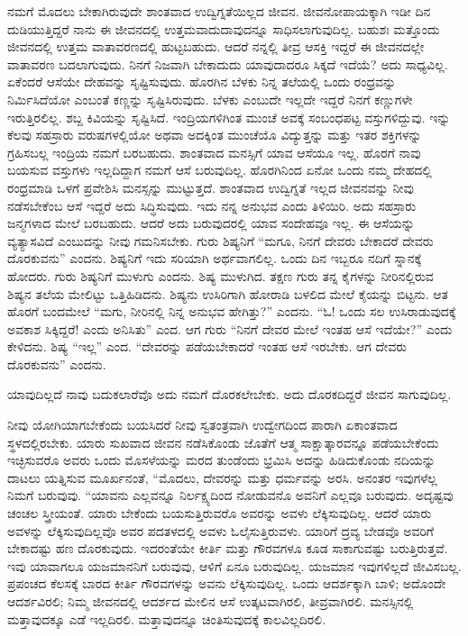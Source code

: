 ನಮಗೆ ಮೊದಲು ಬೇಕಾಗಿರುವುದೇ ಶಾಂತವಾದ ಉದ್ವಿಗ್ನತೆಯಿಲ್ಲದ ಜೀವನ. ಜೀವನೋಪಾಯಕ್ಕಾಗಿ ಇಡೀ ದಿನ ದುಡಿಯುತ್ತಿದ್ದರೆ ನಾನು ಈ ಜೀವನದಲ್ಲಿ ಉತ್ತಮವಾದುದಾವುದನ್ನೂ ಸಾಧಿಸಲಾಗುವುದಿಲ್ಲ. ಬಹುಶಃ ಮತ್ತೊಂದು ಜೀವನದಲ್ಲಿ ಉತ್ತಮ ವಾತಾವರಣದಲ್ಲಿ ಹುಟ್ಟಬಹುದು. ಆದರೆ ನನ್ನಲ್ಲಿ ತೀವ್ರ ಆಸಕ್ತಿ ಇದ್ದರೆ ಈ ಜೀವನದಲ್ಲೇ ವಾತಾವರಣ ಬದಲಾಗುವುದು. ನಿನಗೆ ನಿಜವಾಗಿ ಬೇಕಾದುದು ಯಾವುದಾದರೂ ಸಿಕ್ಕದೆ ಇದೆಯೆ? ಅದು ಸಾಧ್ಯವಿಲ್ಲ. ಏಕೆಂದರೆ ಆಸೆಯೇ ದೇಹವನ್ನು ಸೃಷ್ಟಿಸುವುದು. ಹೊರಗಿನ ಬೆಳಕು ನಿನ್ನ ತಲೆಯಲ್ಲಿ ಒಂದು ರಂಧ್ರವನ್ನು ನಿರ್ಮಿಸಿದೆಯೋ ಎಂಬಂತೆ ಕಣ್ಣನ್ನು ಸೃಷ್ಟಿಸಿರುವುದು. ಬೆಳಕು ಎಂಬುದೇ ಇಲ್ಲದೇ ಇದ್ದರೆ ನಿನಗೆ ಕಣ್ಣುಗಳೇ ಇರುತ್ತಿರಲಿಲ್ಲ. ಶಬ್ದ ಕಿವಿಯನ್ನು ಸೃಷ್ಟಿಸಿದೆ. ಇಂದ್ರಿಯಗಳಿಗಿಂತ ಮುಂಚೆ ಅವಕ್ಕೆ ಸಂಬಂಧಪಟ್ಟ ವಸ್ತುಗಳಿದ್ದುವು. ಇನ್ನು ಕೆಲವು ಸಹಸ್ರಾರು ವರುಷಗಳಲ್ಲಿಯೋ ಅಥವಾ ಅದಕ್ಕಿಂತ ಮುಂಚೆಯೊ ವಿದ್ಯುತ್ತನ್ನು ಮತ್ತು ಇತರ ಶಕ್ತಿಗಳನ್ನು ಗ್ರಹಿಸಬಲ್ಲ ಇಂದ್ರಿಯ ನಮಗೆ ಬರಬಹುದು. ಶಾಂತವಾದ ಮನಸ್ಸಿಗೆ ಯಾವ ಆಸೆಯೂ ಇಲ್ಲ. ಹೊರಗೆ ನಾವು ಬಯಸುವ ವಸ್ತುಗಳು ಇಲ್ಲದಿದ್ದಾಗ ನಮಗೆ ಆಸೆ ಬರುವುದಿಲ್ಲ. ಹೊರಗಿನಿಂದ ಏನೋ ಒಂದು ನಮ್ಮ ದೇಹದಲ್ಲಿ ರಂಧ್ರಮಾಡಿ ಒಳಗೆ ಪ್ರವೇಶಿಸಿ ಮನಸ್ಸನ್ನು ಮುಟ್ಟುತ್ತದೆ. ಶಾಂತವಾದ ಉದ್ವಿಗ್ನತೆ ಇಲ್ಲದ ಜೀವನವನ್ನು ನೀವು ನಡೆಸಬೇಕೆಂಬ ಆಸೆ ಇದ್ದರೆ ಅದು ಸಿದ್ಧಿಸುವುದು. ಇದು ನನ್ನ ಅನುಭವ ಎಂದು ತಿಳಿಯಿರಿ. ಅದು ಸಹಸ್ರಾರು ಜನ್ಮಗಳಾದ ಮೇಲೆ ಬರಬಹುದು. ಆದರೆ ಅದು ಬರುವುದರಲ್ಲಿ ಯಾವ ಸಂದೇಹವೂ ಇಲ್ಲ. ಈ ಆಸೆಯನ್ನು ವ್ಯತ್ಯಾಸವಿದೆ ಎಂಬುದನ್ನು ನೀವು ಗಮನಿಸಬೇಕು. ಗುರು ಶಿಷ್ಯನಿಗೆ “ಮಗೂ, ನಿನಗೆ ದೇವರು ಬೇಕಾದರೆ ದೇವರು ದೊರಕುವನು” ಎಂದನು. ಶಿಷ್ಯನಿಗೆ ಇದು ಸರಿಯಾಗಿ ಅರ್ಥವಾಗಲಿಲ್ಲ. ಒಂದು ದಿನ ಇಬ್ಬರೂ ನದಿಗೆ ಸ್ನಾನಕ್ಕೆ ಹೋದರು. ಗುರು ಶಿಷ್ಯನಿಗೆ ಮುಳುಗು ಎಂದನು. ಶಿಷ್ಯ ಮುಳುಗಿದ. ತಕ್ಷಣ ಗುರು ತನ್ನ ಕೈಗಳನ್ನು ನೀರಿನಲ್ಲಿರುವ ಶಿಷ್ಯನ ತಲೆಯ ಮೇಲಿಟ್ಟು ಒತ್ತಿಹಿಡಿದನು. ಶಿಷ್ಯನು ಉಸಿರಿಗಾಗಿ ಹೋರಾಡಿ ಬಳಲಿದ ಮೇಲೆ ಕೈಯನ್ನು ಬಿಟ್ಟನು. ಆತ ಹೊರಗೆ ಬಂದಮೇಲೆ “ಮಗು, ನೀರಿನಲ್ಲಿ ನಿನ್ನ ಅನುಭವ ಹೇಗಿತ್ತು?” ಎಂದನು. “ಓ! ಒಂದು ಸಲ ಉಸಿರಾಡುವುದಕ್ಕೆ ಅವಕಾಶ ಸಿಕ್ಕಿದ್ದರೆ! ಎಂದು ಅನಿಸಿತು” ಎಂದ. ಆಗ ಗುರು “ನಿನಗೆ ದೇವರ ಮೇಲೆ ಇಂತಹ ಆಸೆ ಇದೆಯೇ?” ಎಂದು ಕೇಳಿದನು. ಶಿಷ್ಯ “ಇಲ್ಲ” ಎಂದ. “ದೇವರನ್ನು ಪಡೆಯಬೇಕಾದರೆ ಇಂತಹ ಆಸೆ ಇರಬೇಕು. ಆಗ ದೇವರು ದೊರಕುವನು” ಎಂದನು.

ಯಾವುದಿಲ್ಲದೆ ನಾವು ಬದುಕಲಾರೆವೊ ಅದು ನಮಗೆ ದೊರಕಲೇಬೇಕು. ಅದು ದೊರಕದಿದ್ದರೆ ಜೀವನ ಸಾಗುವುದಿಲ್ಲ.

ನೀವು ಯೋಗಿಯಾಗಬೇಕೆಂದು ಬಯಸಿದರೆ ನೀವು ಸ್ವತಂತ್ರವಾಗಿ ಉದ್ವೇಗದಿಂದ ಪಾರಾಗಿ ಏಕಾಂತವಾದ ಸ್ಥಳದಲ್ಲಿರಬೇಕು. ಯಾರು ಸುಖವಾದ ಜೀವನ ನಡೆಸಿಕೊಂಡು ಜೊತೆಗೆ ಆತ್ಮ ಸಾಕ್ಷಾತ್ಕಾರವನ್ನೂ ಪಡೆಯಬೇಕೆಂದು ಇಚ್ಛಿಸುವರೊ ಅವರು ಒಂದು ಮೊಸಳೆಯನ್ನು ಮರದ ತುಂಡೆಂದು ಭ್ರಮಿಸಿ ಅದನ್ನು ಹಿಡಿದುಕೊಂಡು ನದಿಯನ್ನು ದಾಟಲು ಯತ್ನಿಸುವ ಮೂರ್ಖನಂತೆ, “ಮೊದಲು, ದೇವರನ್ನು ಮತ್ತು ಧರ್ಮವನ್ನು ಅರಸಿ. ಅನಂತರ ಇವುಗಳೆಲ್ಲ ನಿಮಗೆ ಬರುವುವು. “ಯಾವನು ಎಲ್ಲವನ್ನೂ ನಿರ್ಲಕ್ಷ್ಯದಿಂದ ನೋಡುವನೊ ಅವನಿಗೆ ಎಲ್ಲವೂ ಬರುವುದು. ಅದೃಷ್ಟವು ಚಂಚಲ ಸ್ತ್ರೀಯಂತೆ. ಯಾರು ಬೇಕೆಂದು ಬಯಸುತ್ತಿರುವರೊ ಅವರನ್ನು ಅವಳು ಲೆಕ್ಕಿಸುವುದಿಲ್ಲ. ಆದರೆ ಯಾರು ಅವಳನ್ನು ಲೆಕ್ಕಿಸುವುದಿಲ್ಲವೊ ಅವರ ಪದತಳದಲ್ಲಿ ಅವಳು ಓಲೈಸುತ್ತಿರುವಳು. ಯಾರಿಗೆ ದ್ರವ್ಯ ಬೇಡವೊ ಅವರಿಗೆ ಬೇಕಾದಷ್ಟು ಹಣ ದೊರಕುವುದು. ಇದರಂತೆಯೇ ಕೀರ್ತಿ ಮತ್ತು ಗೌರವಗಳೂ ಕೂಡ ಸಾಕಾಗುವಷ್ಟು ಬರುತ್ತಿರುತ್ತವೆ. ಇವು ಯಾವಾಗಲೂ ಯಜಮಾನನಿಗೆ ಬರುವುವು, ಆಳಿಗೆ ಏನೂ ಬರುವುದಿಲ್ಲ. ಯಜಮಾನ ಇವುಗಳಿಲ್ಲದೆ ಜೀವಿಸಬಲ್ಲ. ಪ್ರಪಂಚದ ಕೆಲಸಕ್ಕೆ ಬಾರದ ಕೀರ್ತಿ ಗೌರವಗಳನ್ನು ಅವನು ಲೆಕ್ಕಿಸುವುದಿಲ್ಲ. ಒಂದು ಆದರ್ಶಕ್ಕಾಗಿ ಬಾಳಿ; ಅದೊಂದೇ ಆದರ್ಶವಿರಲಿ; ನಿಮ್ಮ ಜೀವನದಲ್ಲಿ ಆದರ್ಶದ ಮೇಲಿನ ಆಸೆ ಉತ್ಕಟವಾಗಿರಲಿ, ತೀವ್ರವಾಗಿರಲಿ. ಮನಸ್ಸಿನಲ್ಲಿ ಮತ್ತಾವುದಕ್ಕೂ ಎಡೆ ಇಲ್ಲದಿರಲಿ. ಮತ್ತಾವುದನ್ನೂ ಚಿಂತಿಸುವುದಕ್ಕೆ ಕಾಲವಿಲ್ಲದಿರಲಿ.

